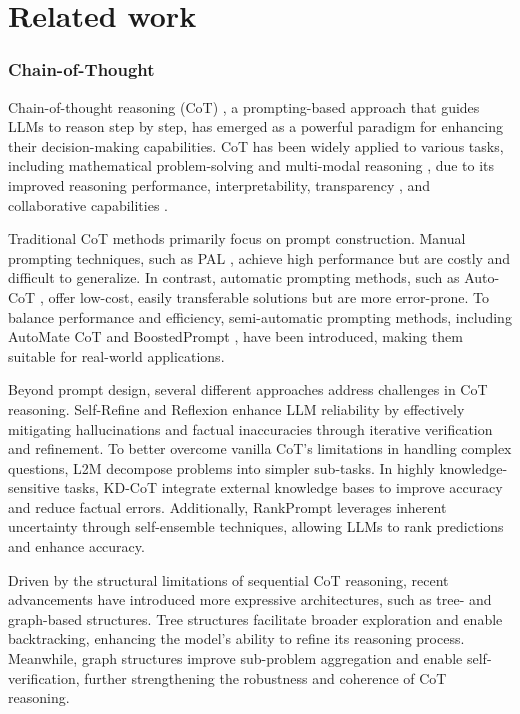 \section{Related work}
\subsubsection{Chain-of-Thought}

Chain-of-thought reasoning (CoT) \cite{kojima2022large,wei2022chain}, a prompting-based approach that guides LLMs to reason step by step, has emerged as a powerful paradigm for enhancing their decision-making capabilities. CoT has been widely applied to various tasks, including mathematical problem-solving \cite{mishra2022lila} and multi-modal reasoning \cite{chen2023measuring,lu2022learn}, due to its improved reasoning performance, interpretability, transparency \cite{wang2023knowledge}, and collaborative capabilities \cite{le2024visualcoder}.

Traditional CoT methods primarily focus on prompt construction. Manual prompting techniques, such as PAL \cite{gao2023pal}, achieve high performance but are costly and difficult to generalize. In contrast, automatic prompting methods, such as Auto-CoT \cite{zhang2022automatic}, offer low-cost, easily transferable solutions but are more error-prone. To balance performance and efficiency, semi-automatic prompting methods, including AutoMate CoT \cite{shum2023automatic} and BoostedPrompt \cite{pitis2023boosted}, have been introduced, making them suitable for real-world applications.


Beyond prompt design, several different approaches address challenges in CoT reasoning. Self-Refine \cite{madaan2024self} and Reflexion \cite{shinn2024reflexion} enhance LLM reliability by effectively mitigating hallucinations and factual inaccuracies through iterative verification and refinement. To better overcome vanilla CoT’s limitations in handling complex questions, L2M \cite{zhou2022least} decompose problems into simpler sub-tasks. In highly knowledge-sensitive tasks, KD-CoT \cite{wang2023knowledge} integrate external knowledge bases to improve accuracy and reduce factual errors. Additionally, RankPrompt \cite{hu2024rankprompt} leverages inherent uncertainty through self-ensemble techniques, allowing LLMs to rank predictions and enhance accuracy.




Driven by the structural limitations of sequential CoT reasoning, recent advancements have introduced more expressive architectures, such as tree- and graph-based structures. Tree structures \cite{yao2024tree,chen2024boosting} facilitate broader exploration and enable backtracking, enhancing the model’s ability to refine its reasoning process. Meanwhile, graph structures \cite{lei2023boosting,besta2024graph} improve sub-problem aggregation and enable self-verification, further strengthening the robustness and coherence of CoT reasoning.


